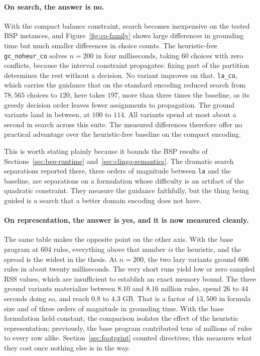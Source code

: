 \paragraph{On search, the answer is no.} With the compact balance constraint, search becomes inexpensive on the tested BSP instances, and Figure~\ref{fig:co-family} shows large differences in grounding time but much smaller differences in choice counts. The heuristic-free \texttt{gc\_noheur\_co} solves $n=200$ in four milliseconds, taking $60$ choices with zero conflicts, because the interval constraint propagates: fixing part of the partition determines the rest without a decision. No variant improves on that. \texttt{la\_co}, which carries the guidance that on the standard encoding reduced search from $78{,}565$ choices to $120$, here takes $197$, more than three times the baseline, as its greedy decision order leaves fewer assignments to propagation. The ground variants land in between, at $100$ to $114$. All variants spend at most about a second in search across this suite. The measured differences therefore offer no practical advantage over the heuristic-free baseline on the compact encoding.

This is worth stating plainly because it bounds the BSP results of Sections~\ref{sec:bsp-runtime} and~\ref{sec:clingo-semantics}. The dramatic search separations reported there, three orders of magnitude between \texttt{la} and the baseline, are separations on a formulation whose difficulty is an artifact of the quadratic constraint. They measure the guidance faithfully, but the thing being guided is a search that a better domain encoding does not have.

\paragraph{On representation, the answer is yes, and it is now measured cleanly.} The same table makes the opposite point on the other axis. With the base program at $604$ rules, everything above that number \emph{is} the heuristic, and the spread is the widest in the thesis. At $n=200$, the two lazy variants ground $606$ rules in about twenty milliseconds. The very short runs yield low or zero sampled RSS values, which are insufficient to establish an exact memory bound. The three ground variants materialize between $8.10$ and $8.16$ million rules, spend $26$ to $44$ seconds doing so, and reach $0.8$ to $4.3$ GB. That is a factor of $13{,}500$ in formula size and of three orders of magnitude in grounding time. With the base formulation held constant, the comparison isolates the effect of the heuristic representation; previously, the base program contributed tens of millions of rules to every row alike. Section~\ref{sec:footprint} counted directives; this measures what they cost once nothing else is in the way.

